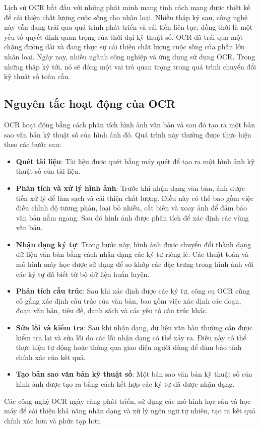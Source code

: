 Lịch sử OCR bắt đầu với những phát minh mang tính cách mạng được thiết kế để cải thiện chất lượng cuộc sống cho nhân loại. Nhiều thập kỷ sau, công nghệ này vẫn đang trải qua quá trình phát triển và cải tiến liên tục, đồng thời là một yếu tố quyết định quan trọng của thời đại kỹ thuật số. OCR đã trải qua một chặng đường dài và đang thực sự cải thiện chất lượng cuộc sống của phần lớn nhân loại. Ngày nay, nhiều ngành công nghiệp và ứng dụng sử dụng OCR. Trong những thập kỷ tới, nó sẽ đóng một vai trò quan trọng trong quá trình chuyển đổi kỹ thuật số toàn cầu.\cite{veryfi}

\subsection{Nguyên tắc hoạt động của OCR}
OCR hoạt động bằng cách phân tích hình ảnh văn bản và sau đó tạo ra một bản sao văn bản kỹ thuật số của hình ảnh đó. Quá trình này thường được thực hiện theo các bước sau:
\begin{itemize}
    \item \textbf{Quét tài liệu}: Tài liệu được quét bằng máy quét để tạo ra một hình ảnh kỹ thuật số của tài liệu.
    \item \textbf{Phân tích và xử lý hình ảnh}: Trước khi nhận dạng văn bản, ảnh được tiền xử lý để làm sạch và cải thiện chất lượng. Điều này có thể bao gồm việc điều chỉnh độ tương phản, loại bỏ nhiễu, cắt biên và xoay ảnh để đảm bảo văn bản nằm ngang. Sau đó hình ảnh được phân tích để xác định các vùng văn bản.
    \item \textbf{Nhận dạng ký tự}: Trong bước này, hình ảnh được chuyển đổi thành dạng dữ liệu văn bản bằng cách nhận dạng các ký tự riêng lẻ. Các thuật toán và mô hình máy học được sử dụng để so khớp các đặc trưng trong hình ảnh với các ký tự đã biết từ bộ dữ liệu huấn luyện.
    \item \textbf{Phân tích cấu trúc}: Sau khi xác định được các ký tự, công cụ OCR cũng cố gắng xác định cấu trúc của văn bản, bao gồm việc xác định các đoạn, đoạn văn bản, tiêu đề, danh sách và các yếu tố cấu trúc khác.
    \item \textbf{Sửa lỗi và kiểm tra}: Sau khi nhận dạng, dữ liệu văn bản thường cần được kiểm tra lại và sửa lỗi do các lỗi nhận dạng có thể xảy ra. Điều này có thể thực hiện tự động hoặc thông qua giao diện người dùng để đảm bảo tính chính xác của kết quả.
    \item \textbf{Tạo bản sao văn bản kỹ thuật số}: Một bản sao văn bản kỹ thuật số của hình ảnh được tạo ra bằng cách kết hợp các ký tự đã được nhận dạng.
\end{itemize}
Các công nghệ OCR ngày càng phát triển, sử dụng các mô hình học sâu và học máy để cải thiện khả năng nhận dạng và xử lý ngôn ngữ tự nhiên, tạo ra kết quả chính xác hơn và phức tạp hơn.

